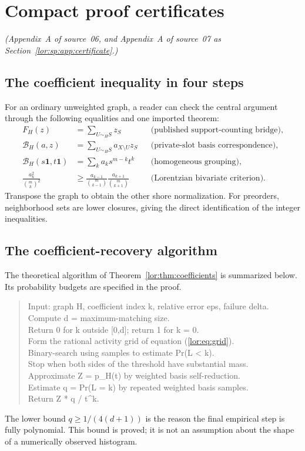 \documentclass[11pt]{article}
\numberwithin{equation}{section}
\theoremstyle{definition}
\begin{document}
\section{Compact proof certificates}
\label{lor:sec:certificates}
\noindent\emph{(Appendix~A of source~06, and Appendix~A of source~07 as Section~\ref{lor:sp:app:certificate}.)}
\subsection{The coefficient inequality in four steps}
For an ordinary unweighted graph, a reader can check the central argument
through the following equalities and one imported theorem:
\begin{align*}
 F_H(z)&=\sum_{U\sim_H S}z_S
       &&\text{(published support-counting bridge)},\\
 \mathcal B_H(a,z)&=\sum_{U\sim_H S}a_{X\setminus U}z_S
       &&\text{(private-slot basis correspondence)},\\
 \mathcal B_H(s\mathbf1,t\mathbf1)&=\sum_ka_ks^{m-k}t^k
       &&\text{(homogeneous grouping)},\\
 \frac{a_k^2}{\binom m k^2}&\ge
 \frac{a_{k-1}}{\binom m{k-1}}\frac{a_{k+1}}{\binom m{k+1}}
       &&\text{(Lorentzian bivariate criterion)}.
\end{align*}
Transpose the graph to obtain the other shore normalization. For
preorders, neighborhood sets are lower closures, giving the direct
identification of the integer inequalities.

\subsection{The coefficient-recovery algorithm}
The theoretical algorithm of Theorem~\ref{lor:thm:coefficients} is summarized
below. Its probability budgets are specified in the proof.
\begin{quote}\small\ttfamily
Input: graph H, coefficient index k, relative error eps, failure delta.\\
Compute d = maximum-matching size.\\
Return 0 for k outside [0,d]; return 1 for k = 0.\\
Form the rational activity grid of equation (\ref{lor:eq:grid}).\\
Binary-search using samples to estimate Pr(L < k).\\
Stop when both sides of the threshold have substantial mass.\\
Approximate Z = p\_H(t) by weighted basis self-reduction.\\
Estimate q = Pr(L = k) by repeated weighted basis samples.\\
Return Z * q / t\^{}k.
\end{quote}
The lower bound $q\ge1/(4(d+1))$ is the reason the final empirical step is
fully polynomial. This bound is proved; it is not an assumption about the
shape of a numerically observed histogram.
\end{document}
